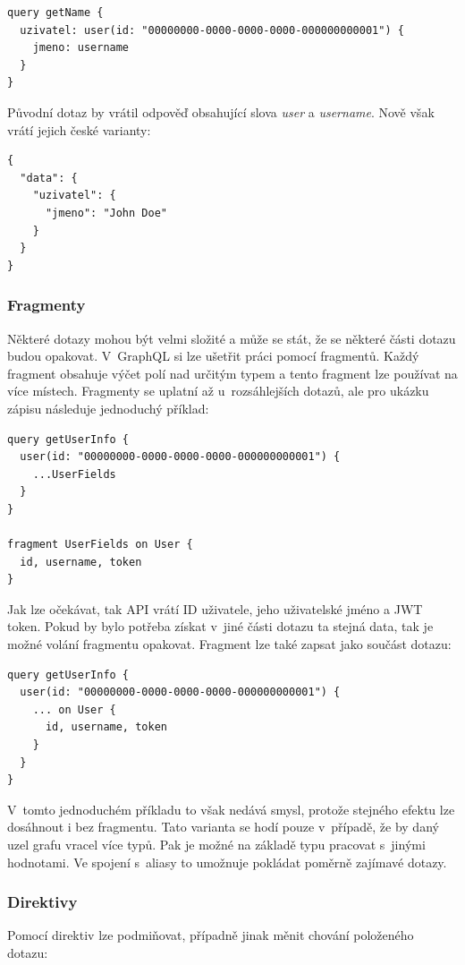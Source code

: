\begin{verbatim}
query getName {
  uzivatel: user(id: "00000000-0000-0000-0000-000000000001") {
    jmeno: username
  }
}
\end{verbatim}
%
Původní dotaz by vrátil odpověď obsahující slova \textit{user} a \textit{username}. Nově však vrátí jejich české varianty:
%
\begin{verbatim}
{
  "data": {
    "uzivatel": {
      "jmeno": "John Doe"
    }
  }
}
\end{verbatim}

\subsubsection{Fragmenty}
Některé dotazy mohou být velmi složité a může se stát, že se některé části dotazu budou opakovat. V~GraphQL si lze ušetřit práci pomocí fragmentů. Každý fragment obsahuje výčet polí nad určitým typem a tento fragment lze používat na více místech. Fragmenty se uplatní až u~rozsáhlejších dotazů, ale pro ukázku zápisu následuje jednoduchý příklad:

\begin{verbatim}
query getUserInfo {
  user(id: "00000000-0000-0000-0000-000000000001") {
    ...UserFields
  }
}

fragment UserFields on User {
  id, username, token
}
\end{verbatim}

Jak lze očekávat, tak API vrátí ID uživatele, jeho uživatelské jméno a JWT token. Pokud by bylo potřeba získat v~jiné části dotazu ta stejná data, tak je možné volání fragmentu opakovat. Fragment lze také zapsat jako součást dotazu:

\begin{verbatim}
query getUserInfo {
  user(id: "00000000-0000-0000-0000-000000000001") {
    ... on User {
      id, username, token
    }
  }
}
\end{verbatim}

V~tomto jednoduchém příkladu to však nedává smysl, protože stejného efektu lze dosáhnout i bez fragmentu. Tato varianta se hodí pouze v~případě, že by daný uzel grafu vracel více typů. Pak je možné na základě typu pracovat s~jinými hodnotami. Ve spojení s~aliasy to umožnuje pokládat poměrně zajímavé dotazy.

\subsubsection{Direktivy}
Pomocí direktiv lze podmiňovat, případně jinak měnit chování položeného dotazu:

